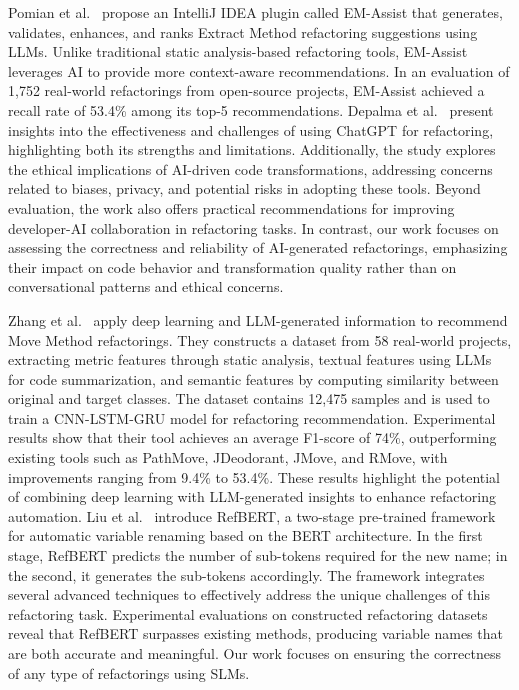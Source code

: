 Pomian et al.~\cite{DBLP:conf/sigsoft/PomianBDKBSBD24} propose an IntelliJ IDEA plugin called EM-Assist that generates, validates, enhances, and ranks Extract Method refactoring suggestions using LLMs. Unlike traditional static analysis-based refactoring tools, EM-Assist leverages AI to provide more context-aware recommendations. In an evaluation of 1,752 real-world refactorings from open-source projects, EM-Assist achieved a recall rate of 53.4\% among its top-5 recommendations. 
Depalma et al.~\cite{DBLP:journals/eswa/DepalmaMHMA24} present insights into the effectiveness and challenges of using ChatGPT for refactoring, highlighting both its strengths and limitations. Additionally, the study explores the ethical implications of AI-driven code transformations, addressing concerns related to biases, privacy, and potential risks in adopting these tools. Beyond evaluation, the work also offers practical recommendations for improving developer-AI collaboration in refactoring tasks. 
In contrast, our work focuses on assessing the correctness and reliability of AI-generated refactorings, emphasizing their impact on code behavior and transformation quality rather than on conversational patterns and ethical concerns.

Zhang et al.~\cite{ZHANG2025121753} apply deep learning and LLM-generated information to recommend Move Method refactorings. They constructs a dataset from 58 real-world projects, extracting metric features through static analysis, textual features using LLMs for code summarization, and semantic features by computing similarity between original and target classes. The dataset contains 12,475 samples and is used to train a CNN-LSTM-GRU model for refactoring recommendation. Experimental results show that their tool achieves an average F1-score of 74\%, outperforming existing tools such as PathMove, JDeodorant, JMove, and RMove, with improvements ranging from 9.4\% to 53.4\%. These results highlight the potential of combining deep learning with LLM-generated insights to enhance refactoring automation. 
Liu et al.~\cite{DBLP:conf/issta/LiuWWXWLJ23} introduce RefBERT, a two-stage pre-trained framework for automatic variable renaming based on the BERT architecture. In the first stage, RefBERT predicts the number of sub-tokens required for the new name; in the second, it generates the sub-tokens accordingly. The framework integrates several advanced techniques to effectively address the unique challenges of this refactoring task. Experimental evaluations on constructed refactoring datasets reveal that RefBERT surpasses existing methods, producing variable names that are both accurate and meaningful.
Our work focuses on ensuring the correctness of any type of refactorings using SLMs.

